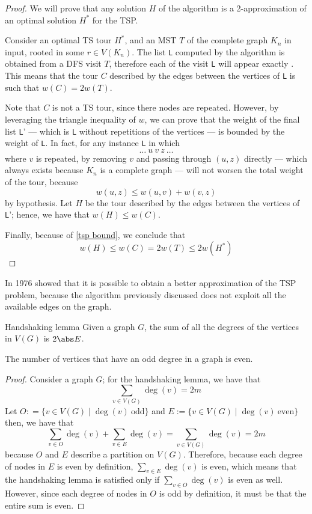 \documentclass[a4paper, 12pt]{report}
\begin{document}
    \begin{proof}
        We will prove that any solution $H$ of the algorithm is a 2-approximation of an optimal solution $H^*$ for the TSP.

        Consider an optimal TS tour $H^*$, and an MST $T$ of the complete graph $K_n$ in input, rooted in some $r \in V(K_n)$. The list \texttt L computed by the algorithm is obtained from a  DFS visit $T$, therefore each  of the visit \texttt L will appear exactly . This means that the tour $C$ described by the edges between the vertices of \texttt L is such that $w(C) = 2 w(T)$.

        Note that $C$ is not a TS tour, since there nodes are repeated. However, by leveraging the triangle inequality of $w$, we can prove that the weight of the final list \texttt L' --- which is \texttt L without repetitions of the vertices --- is bounded by the weight of \texttt L. In fact, for any instance \texttt L in which $$\ldots \ u \ v \ z \ \ldots$$ where $v$ is repeated, by removing $v$ and passing through $(u, z)$ directly --- which always exists because $K_n$ is a complete graph --- will not worsen the total weight of the tour, because $$w(u, z) \le w(u, v) + w(v, z)$$ by hypothesis. Let $H$ be the tour described by the edges between the vertices of \texttt L'; hence, we have that $w(H) \le w(C)$.

        Finally, because of \cref{tsp bound}, we conclude that $$w(H) \le w(C) = 2w(T) \le 2w(H^*)$$
    \end{proof}

    In 1976 \textcite{christofides} showed that it is possible to obtain a better approximation of the TSP problem, because the algorithm previously discussed does not exploit all the available edges on the graph.

    \begin{framedlem}{Handshaking lemma}
        Given a graph $G$, the sum of all the degrees of the vertices in $V(G)$ is $2 \abs E$.
    \end{framedlem}

    \begin{framedcor}[label={odd even}]{}
        The number of vertices that have an odd degree in a graph is even.
    \end{framedcor}

    \begin{proof}
        Consider a graph $G$; for the handshaking lemma, we have that $$\sum_{v \in V(G)}{\deg(v)} = 2 m$$ Let $O: = \{v \in V(G) \mid \deg(v) \ \mathrm{odd}\}$ and $E := \{v \in V(G) \mid \deg(v) \ \mathrm{even}\}$ then, we have that $$\sum_{v \in O}{\deg(v)} + \sum_{v \in E}{\deg(v)} = \sum_{v \in V(G)} {\deg(v)} = 2m$$ because $O$ and $E$ describe a partition on $V(G)$. Therefore, because each degree of nodes in $E$ is even by definition, $\sum_{v \in E}{\deg(v)}$ is even, which means that the handshaking lemma is satisfied only if $\sum_{v \in O}{\deg(v)}$ is even as well. However, since each degree of nodes in $O$ is odd by definition, it must be that the entire sum is even.
    \end{proof}
\end{document}
